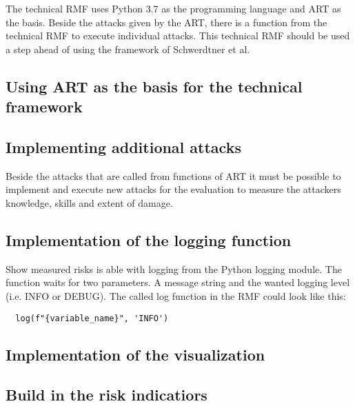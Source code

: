The technical RMF uses Python 3.7 as the programming language and ART as the basis. Beside the attacks given by the ART, there is a function from the technical RMF to execute individual attacks. This technical RMF should be used a step ahead of using the framework of Schwerdtner et al.

\subsection{Using ART as the basis for the technical framework}

\subsection{Implementing additional attacks}

Beside the attacks that are called from functions of ART it must be possible to implement and execute new attacks for the evaluation to measure the attackers knowledge, skills and extent of damage.

\subsection{Implementation of the logging function}

Show measured risks is able with logging from the Python logging module. The function waits for two parameters. A message string and the wanted logging level (i.e. INFO or DEBUG). The called log function in the RMF could look like this:
\begin{lstlisting}
  log(f"{variable_name}", 'INFO')
\end{lstlisting}

\subsection{Implementation of the visualization}

\subsection{Build in the risk indicatiors}
